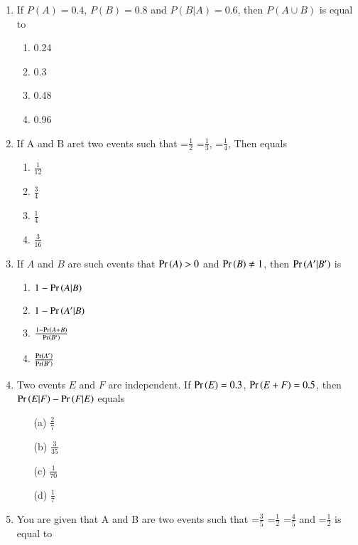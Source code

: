 \begin{enumerate}[resume*]
\solution

\item If $P(A)=0.4$, $P(B)=0.8$ and $P(B|A)=0.6$, then $P(A \cup B)$ is equal to
\begin{enumerate}
\item 0.24
\item 0.3
\item 0.48
\item 0.96
\end{enumerate}

\solution

\item If A and B aret two events such that  =$\frac{1}{2}$  =$\frac{1}{3}$, =$\frac{1}{4}$, Then  equals
\begin{enumerate}
	\item $\frac{1}{12}$
	\item $\frac{3}{4}$
	\item $\frac{1}{4}$
	\item $\frac{3}{16}$	
\end{enumerate}
\solution

\item If $A$ and $B$ are such events that $\Pr\left(A\right) > 0$ and $\Pr\left(B\right)\neq 1$, then $\Pr\left(A^\prime|B^\prime\right)$ is
\begin{enumerate}
\item $1-\Pr\left(A|B\right)$
\item $1-\Pr\left(A^\prime|B\right)$
\item $\frac{1-\Pr\left(A+B\right)}{\Pr\left(B^\prime\right)}$
\item $\frac{\Pr\left(A^\prime\right)}{\Pr\left(B^\prime\right)}$
\end{enumerate}

\item  Two events $E$ and $F$ are independent. If $\Pr\left(E\right) = 0.3$, $\Pr\left(E+F\right) = 0.5$, then $\Pr\left(E|F\right)-\Pr\left(F|E\right)$ equals
\begin{enumerate}
    \item[(a)] $\frac{2}{7}$
    \item[(b)] $\frac{3}{35}$
    \item[(c)] $\frac{1}{70}$
    \item[(d)] $\frac{1}{7}$
\end{enumerate}
\solution

\item You are given that A and B are two events such that =$\frac{3}{5}$ =$\frac{1}{2}$ =$\frac{4}{5}$ and =$\frac{1}{2}$   is equal to\\

\end{enumerate}
